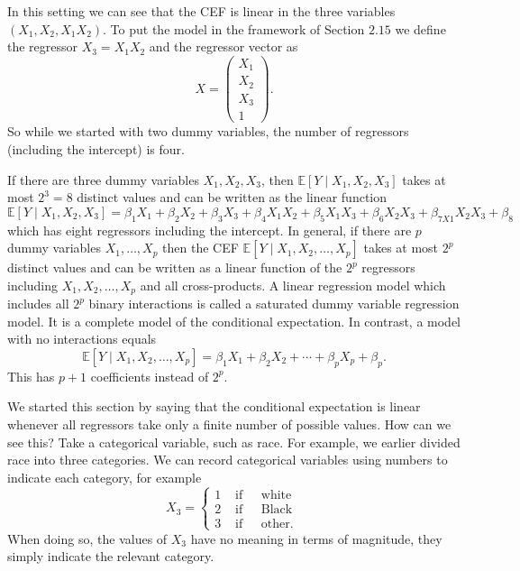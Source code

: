 \documentclass[10pt]{article}
\begin{document}
In this setting we can see that the CEF is linear in the three variables $\left(X_{1}, X_{2}, X_{1} X_{2}\right)$. To put the model in the framework of Section $2.15$ we define the regressor $X_{3}=X_{1} X_{2}$ and the regressor vector as
$$
X=\left(\begin{array}{c}
X_{1} \\
X_{2} \\
X_{3} \\
1
\end{array}\right) .
$$
So while we started with two dummy variables, the number of regressors (including the intercept) is four.

If there are three dummy variables $X_{1}, X_{2}, X_{3}$, then $\mathbb{E}\left[Y \mid X_{1}, X_{2}, X_{3}\right]$ takes at most $2^{3}=8$ distinct values and can be written as the linear function
$$
\mathbb{E}\left[Y \mid X_{1}, X_{2}, X_{3}\right]=\beta_{1} X_{1}+\beta_{2} X_{2}+\beta_{3} X_{3}+\beta_{4} X_{1} X_{2}+\beta_{5} X_{1} X_{3}+\beta_{6} X_{2} X_{3}+\beta_{7 X 1} X_{2} X_{3}+\beta_{8}
$$
which has eight regressors including the intercept. In general, if there are $p$ dummy variables $X_{1}, \ldots, X_{p}$ then the CEF $\mathbb{E}\left[Y \mid X_{1}, X_{2}, \ldots, X_{p}\right]$ takes at most $2^{p}$ distinct values and can be written as a linear function of the $2^{p}$ regressors including $X_{1}, X_{2}, \ldots, X_{p}$ and all cross-products. A linear regression model which includes all $2^{p}$ binary interactions is called a saturated dummy variable regression model. It is a complete model of the conditional expectation. In contrast, a model with no interactions equals
$$
\mathbb{E}\left[Y \mid X_{1}, X_{2}, \ldots, X_{p}\right]=\beta_{1} X_{1}+\beta_{2} X_{2}+\cdots+\beta_{p} X_{p}+\beta_{p} .
$$
This has $p+1$ coefficients instead of $2^{p}$.

We started this section by saying that the conditional expectation is linear whenever all regressors take only a finite number of possible values. How can we see this? Take a categorical variable, such as race. For example, we earlier divided race into three categories. We can record categorical variables using numbers to indicate each category, for example
$$
X_{3}=\left\{\begin{array}{lll}
1 & \text { if } & \text { white } \\
2 & \text { if } & \text { Black } \\
3 & \text { if } & \text { other. }
\end{array}\right.
$$
When doing so, the values of $X_{3}$ have no meaning in terms of magnitude, they simply indicate the relevant category.
\end{document}
